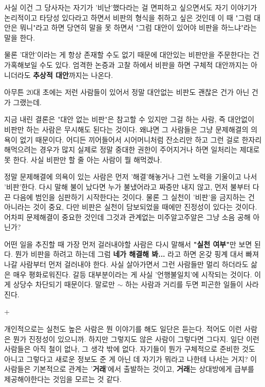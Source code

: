 사실 이건 그 당사자는 자기가 '비난'했다라는 걸 면피하고 싶으면서도
자기 이야기가 논리적이고 타당성 있다라고 하면서 비판의 형식을 취하고 싶은 것인데
이 때 "그럼 대안은 뭐니"라고 하면 당연히 말을 못 하면서 "그럼 대안이 있어야 비판을 하느냐"라는 말을 한다.
\vspace{5mm}

물론 '대안'이라는 게 항상 존재할 수도 없기 때문에 대안있는 비판만을 주문한다는 건 가혹해보일 수도 있다.
엄격한 논증과 고찰 하에서 비판을 하면 구체적 대안까지는 아니더라도 \textbf{추상적 대안}까지는 나온다.
\vspace{5mm}

아무튼 20대 초에는 저런 사람들이 있어서 정말 대안없는 비판도 괜찮은 건가 아닌 건가 그랬는데.
\vspace{5mm}

지금 내린 결론은 "대안 없는 비판"은 참고할 수 있지만 그걸 하는 사람, 즉 대안없이 비판만 하는 사람은 무시해도 된다는 것이다.
왜냐면 그 사람들은 그냥 문제해결의 의욕이 없기 때문이다.
어디든 끼어들어서 시어머니처럼 잔소리만 하고 그런 걸로 한자리 해먹으려는 경우가 많지
실제로 정말 중대한 권한이 주어지거나 하면 일처리는 제대로 못 한다.
사실 비판만 할 줄 아는 사람이 뭘 해먹겠나.
\vspace{5mm}

정말 문제해결에 의욕이 있는 사람은 먼저 '해결'해놓거나 그런 노력을 기울이고 나서  '비판'한다.
다시 말해 불이 났다면 누가 불냈어라고 짜증만 내지 않고, 먼저 불부터 다 끈 다음에 범인을 심판하기 시작한다는 것이다.
물론 그 실천이 '비판'을 금지하는 건 아니라는 것이 중요,
다만 비판은 실천이 담보되었을 때에만 진정성이 있다는 것이다.
어차피 문제해결이 중요한 것인데 그것과 관계없는 미주알고주알은 그냥 소음 공해 아닌가?
\vspace{5mm}

어떤 일을 추진할 때 가장 먼저 걸러내야할 사람은 다시 말해서 \textbf{"실천 여부"}만 보면 된다.
뭔가 비판을 하려고 하는데 그럼 \textbf{네가 해결해 봐...} 라고 하면 온갖 핑계 대서 빠져나갈 사람부터 먼저 걸러내야 한다.
사실 살아가면서 그런 사람들만 멀리 하더라도 삶은 매우 평화로워진다.
갈등 대부분이라는 게 사실 '언행불일치'에 시작되는 것이다. 이게 상당수 차단되기 때문이다.
말로만 $\sim$ 하는 사람과 거리를 두면 피곤한 일들이 사라진다.
\vspace{5mm}

+
\vspace{5mm}

개인적으로는 실천도 높은 사람은 뭔 이야기를 해도 일단은 듣는다. 적어도 이런 사람은 뭔가 진정성이 있으니까.
하지만 그렇지도 않은 사람이 그렇다면 그다지. 일단 이런 사람들은 아직 철이 없나, 그 생각 밖에 없다.
자기들이 뭔가 구체적으로 준비한 것도 아니고 그렇다고 새로운 정보도 준 게 아닌 데 자기가 뭐라고 나한테 나서는 거지?
이 사람들은 기본적으로 관계는 '\textbf{거래}'에서 출발하는 것이고, \textbf{거래}는 상대방에게 급부를 제공해야한다는 것임을 모르는 것 같다.
\vspace{5mm}

